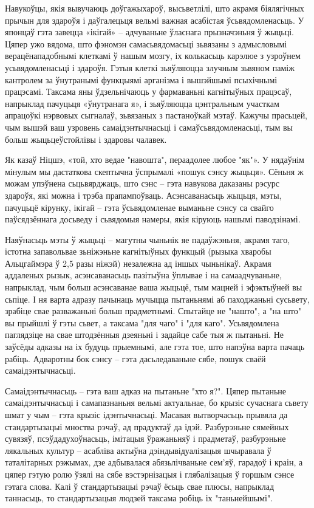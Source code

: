 Навукоўцы, якія вывучаюць доўгажыхароў, высьветлілі, што акрамя біялягічных прычын для здароўя і даўгалецьця вельмі важная асабістая ўсьвядомленасьць. У японцаў гэта завецца «ікігай» -- адчуваньне ўласнага прызначэньня ў жыцьці. Цяпер ужо вядома, што фэномэн самасьвядомасьці зьвязаны з адмысловымі верацёнападобнымі клеткамі ў нашым мозгу, іх колькасьць карэлюе з узроўнем усьвядомленасьці і здароўя. Гэтыя клеткі зьяўляюцца злучным зьвяном паміж кантролем за ўнутранымі функцыямі арганізма і вышэйшымі псыхічнымі працэсамі. Таксама яны ўдзельнічаюць у фармаваньні кагнітыўных працэсаў, напрыклад пачуцьця «ўнутранага я», і зьяўляюцца цэнтральным участкам апрацоўкі нэрвовых сыгналаў, зьвязаных з пастаноўкай мэтаў. Кажучы прасьцей, чым вышэй ваш узровень самаідэнтычнасьці і самаўсьвядомленасьці, тым вы больш жыцьцеўстойлівы і здаровы чалавек.

Як казаў Ніцшэ, «той, хто ведае "навошта", пераадолее любое "як"». У нядаўнім мінулым мы дастаткова скептычна ўспрымалі «пошук сэнсу жыцьця». Сёньня ж можам упэўнена сьцьвярджаць, што сэнс – гэта навукова даказаны рэсурс здароўя, які можна і трэба прапампоўваць. Асэнсаванасьць жыцьця, мэты, пачуцьцё кірунку, ікігай – гэта ўсьвядомленае выманьне сэнсу са свайго паўсядзённага досьведу і сьвядомыя намеры, якія кіруюць нашымі паводзінамі.

Наяўнасьць мэты ў жыцьці – магутны чыньнік яе падаўжэньня, акрамя таго, істотна запавольвае зьніжэньне кагнітыўных функцый (рызыка хваробы Альцгаймэра ў 2,5 разы ніжэй) незалежна ад іншых чыньнікаў. Акрамя аддаленых рызык, асэнсаванасьць пазітыўна ўплывае і на самаадчуваньне, напрыклад, чым больш асэнсаванае ваша жыцьцё, тым мацней і эфэктыўней вы сьпіце. І ня варта адразу пачынаць мучыцца пытаньнямі аб паходжаньні сусьвету, зрабіце свае разважаньні больш прадметнымі. Спытайце не "нашто", а "на што" вы прыйшлі ў гэты сьвет, а таксама "для чаго" і "для каго". Усьвядомлена паглядзіце на свае штодзённыя дзеяньні і задайце сабе тыя ж пытаньні. Не заўсёды адказы на іх будуць прыемнымі, але гэта тое, што напэўна варта пачаць рабіць. Адваротны бок сэнсу – гэта дасьледаваньне сябе, пошук сваёй самаідэнтычнасьці.

Самаідэнтычнасьць – гэта ваш адказ на пытаньне "хто я?". Цяпер пытаньне самаідэнтычнасьці і самапазнаньня вельмі актуальнае, бо крызіс сучаснага сьвету шмат у чым – гэта крызіс ідэнтычнасьці. Масавая вытворчасьць прывяла да стандартызацыі мноства рэчаў, ад прадуктаў да ідэй. Разбурэньне сямейных сувязяў, псэўдадухоўнасьць, імітацыя ўражаньняў і прадметаў, разбурэньне лякальных культур – асабліва актыўна дэіндывідуалізацыя шчыравала ў таталітарных рэжымах, дзе адбывалася абязьлічваньне сем'яў, гарадоў і краін, а цяпер гэтую ролю ўзялі на сябе вэстэрнізацыя і глябалізацыя ў горшым сэнсе гэтага слова. Калі ў стандартызацыі рэчаў ёсьць свае плюсы, напрыклад таннасьць, то стандартызацыя людзей таксама робіць іх "таньнейшымі".

